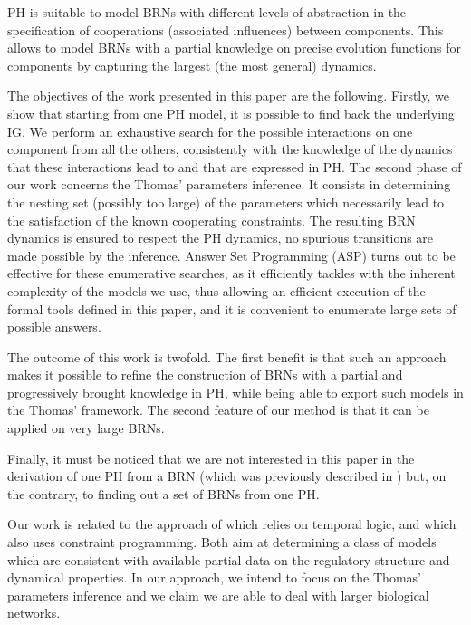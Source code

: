 PH is suitable to model BRNs with different levels of abstraction in the specification of
cooperations (associated influences) between components.
This allows to model BRNs with a partial knowledge on precise evolution functions for components
by capturing the largest (the most general) dynamics.

The objectives of the work presented in this paper are the following.
Firstly, we show that starting from one PH model, it is possible to find back the underlying IG.
We perform an exhaustive search for the possible interactions on one component from all the
others, consistently with the knowledge of the dynamics that these interactions lead to and that are
expressed in PH.
The second phase of our work concerns the Thomas' parameters inference.
It consists in determining the nesting set (possibly too large) of the parameters which necessarily
lead to the satisfaction of the known cooperating constraints.
The resulting BRN dynamics is ensured to respect the PH dynamics, \ie no spurious transitions are
made possible by the inference.
Answer Set Programming (ASP) \cite{Baral03} turns out to be effective for these enumerative searches,
as it efficiently tackles with the inherent complexity of the models we use, thus allowing an efficient execution of the formal tools defined in this paper, and it is convenient to enumerate large sets of possible answers.

The outcome of this work is twofold.
The first benefit is that such an approach makes it possible to refine the construction of
BRNs with a partial and progressively brought knowledge in PH, while being able to export such
models in the Thomas' framework.
The second feature of our method is that it can be applied on very large BRNs.

Finally, it must be noticed that we are not interested in this paper in the derivation of one
PH from a BRN (which was previously described in \cite{PMR10-TCSB}) but, on the contrary, to finding out
a set of BRNs from one PH.

Our work is related to the approach of \cite{Khalis09} which relies on temporal logic, and \cite{20646302,DBLP:conf/ipcat/CorblinFTCT12} which also uses constraint programming. Both aim at determining a class of models which are consistent with available partial data on the regulatory structure and dynamical properties.
In our approach, we intend to focus on the Thomas' parameters inference and we claim we are able to deal with larger biological networks.

